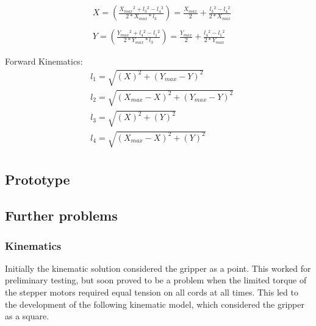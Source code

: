 \documentclass[conference]{IEEEtran}
\begin{document}
\begin{equation}
\begin{aligned}
&X = \left(\frac{X_{max}{}^2 + l_3{}^2 - l_4{}^2}{2*X_{max}*l_3}\right) = \frac{X_{max}}{2} + \frac{l_3{}^2 - l_4{}^2}{2*X_{max}}\\ \\
&Y = \left(\frac{Y_{max}{}^2 + l_4{}^2 - l_1{}^2}{2*Y_{max}*l_3}\right) = \frac{Y_{max}}{2} + \frac{l_4{}^2 - l_1{}^2}{2*Y_{max}}
\end{aligned}
\end{equation}

Forward Kinematics:
\begin{equation}
\begin{aligned}
&l_1 = \sqrt{\left(X\right)^2 + \left(Y_{max}-Y\right)^2}\\
&l_2 = \sqrt{\left(X_{max}-X\right)^2 + \left(Y_{max}-Y\right)^2}\\
&l_3 = \sqrt{\left(X\right)^2 + \left(Y\right)^2}\\
&l_4 = \sqrt{\left(X_{max}-X\right)^2 + \left(Y\right)^2}\\
\end{aligned}
\end{equation}
\subsection{Prototype}
\subsection{Further problems}
\subsubsection{Kinematics}
Initially the kinematic solution considered the gripper as a point. This worked for preliminary testing, but soon proved to be a problem when the limited torque of the stepper motors required equal tension on all cords at all times. This led to the development of the following kinematic model, which considered the gripper as a square. 
\end{document}
